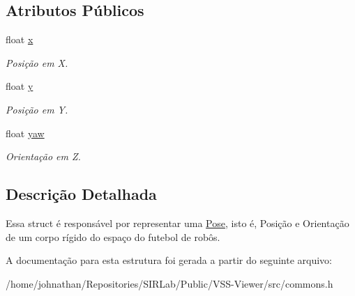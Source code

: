 \subsection*{Atributos Públicos}
\begin{DoxyCompactItemize}
\item 
float \hyperlink{structcommon_1_1Pose_a4ea360bde6890187e0a8ce0ca57fa031}{x}\hypertarget{structcommon_1_1Pose_a4ea360bde6890187e0a8ce0ca57fa031}{}\label{structcommon_1_1Pose_a4ea360bde6890187e0a8ce0ca57fa031}

\begin{DoxyCompactList}\small\item\em Posição em X. \end{DoxyCompactList}\item 
float \hyperlink{structcommon_1_1Pose_aa7debd220c3cb6f294253188045a4d0d}{y}\hypertarget{structcommon_1_1Pose_aa7debd220c3cb6f294253188045a4d0d}{}\label{structcommon_1_1Pose_aa7debd220c3cb6f294253188045a4d0d}

\begin{DoxyCompactList}\small\item\em Posição em Y. \end{DoxyCompactList}\item 
float \hyperlink{structcommon_1_1Pose_a6abb6006c34912516585beeb33077c6c}{yaw}\hypertarget{structcommon_1_1Pose_a6abb6006c34912516585beeb33077c6c}{}\label{structcommon_1_1Pose_a6abb6006c34912516585beeb33077c6c}

\begin{DoxyCompactList}\small\item\em Orientação em Z. \end{DoxyCompactList}\end{DoxyCompactItemize}


\subsection{Descrição Detalhada}
Essa struct é responsável por representar uma \hyperlink{structcommon_1_1Pose}{Pose}, isto é, Posição e Orientação de um corpo rígido do espaço do futebol de robôs. 

A documentação para esta estrutura foi gerada a partir do seguinte arquivo\+:\begin{DoxyCompactItemize}
\item 
/home/johnathan/\+Repositories/\+S\+I\+R\+Lab/\+Public/\+V\+S\+S-\/\+Viewer/src/commons.\+h\end{DoxyCompactItemize}
